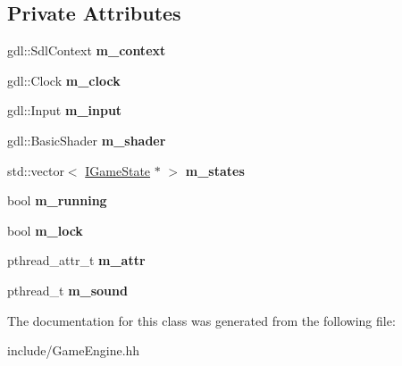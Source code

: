 \subsection*{Private Attributes}
\begin{DoxyCompactItemize}
\item 
\hypertarget{class_game_engine_a5ff384f98b3638039e07ef48f6d3c828}{}gdl\+::\+Sdl\+Context {\bfseries m\+\_\+context}\label{class_game_engine_a5ff384f98b3638039e07ef48f6d3c828}

\item 
\hypertarget{class_game_engine_a633938e001498d4d1ca4b824221360f7}{}gdl\+::\+Clock {\bfseries m\+\_\+clock}\label{class_game_engine_a633938e001498d4d1ca4b824221360f7}

\item 
\hypertarget{class_game_engine_ae48690f042e2a9e401395f4a010ccd38}{}gdl\+::\+Input {\bfseries m\+\_\+input}\label{class_game_engine_ae48690f042e2a9e401395f4a010ccd38}

\item 
\hypertarget{class_game_engine_afe772008322c982de843ae3d9b28bc12}{}gdl\+::\+Basic\+Shader {\bfseries m\+\_\+shader}\label{class_game_engine_afe772008322c982de843ae3d9b28bc12}

\item 
\hypertarget{class_game_engine_adc3eed19591e1fa6db5939952c22ad85}{}std\+::vector$<$ \hyperlink{class_i_game_state}{I\+Game\+State} $\ast$ $>$ {\bfseries m\+\_\+states}\label{class_game_engine_adc3eed19591e1fa6db5939952c22ad85}

\item 
\hypertarget{class_game_engine_ae587c23c6915881101bb2110dcb9370e}{}bool {\bfseries m\+\_\+running}\label{class_game_engine_ae587c23c6915881101bb2110dcb9370e}

\item 
\hypertarget{class_game_engine_a44d3485f57df88e39423b3ec89382299}{}bool {\bfseries m\+\_\+lock}\label{class_game_engine_a44d3485f57df88e39423b3ec89382299}

\item 
\hypertarget{class_game_engine_a05519032ab7b2e24af50a44e43dceb8b}{}pthread\+\_\+attr\+\_\+t {\bfseries m\+\_\+attr}\label{class_game_engine_a05519032ab7b2e24af50a44e43dceb8b}

\item 
\hypertarget{class_game_engine_ae912189ab93c1a1e14c9af6eab27f9cb}{}pthread\+\_\+t {\bfseries m\+\_\+sound}\label{class_game_engine_ae912189ab93c1a1e14c9af6eab27f9cb}

\end{DoxyCompactItemize}


The documentation for this class was generated from the following file\+:\begin{DoxyCompactItemize}
\item 
include/Game\+Engine.\+hh\end{DoxyCompactItemize}
